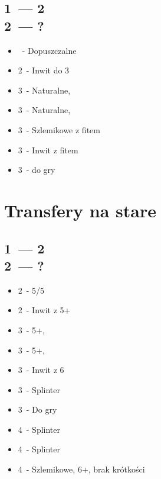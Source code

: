 \documentclass[12pt, a4paper]{article}
\begin{document}
    \subsection{1\ntx\ --- 2\clubs \\ 2\spades\ --- ?}
    \begin{itemize}
        \item \pass\ - Dopuszczalne
        \item 2\nt\ - Inwit do 3\nt \br
        \item 3\clubs\ - Naturalne, \gf
        \item 3\diams\ - Naturalne, \gf 
        \item 3\hearts\ - Szlemikowe z fitem \spades
        \item 3\spades\ - Inwit z fitem \spades
        \item 3\nt\ - do gry
    \end{itemize}

    \pagebreak


    \section{Transfery na stare}
    \subsection{1\ntx\ --- 2\diams \\ 2\hearts\ --- ?}
    \begin{itemize}
        \item 2\spades\ - 5/5 \major\ \gf
        \item 2\nt\ - Inwit z 5+\hearts
        \item 3\clubs\ - 5+\clubs, \gf 
        \item 3\diams\ - 5+\diams, \gf \br
        \item 3\hearts\ - Inwit z 6\hearts 
        \item 3\spades\ - Splinter \spades
        \item 3\nt\ - Do gry \br
        \item 4\clubs\ - Splinter \clubs 
        \item 4\diams\ - Splinter \diams
        \item 4\hearts\ - Szlemikowe, 6+\hearts, brak krótkości
    \end{itemize}
\end{document}
